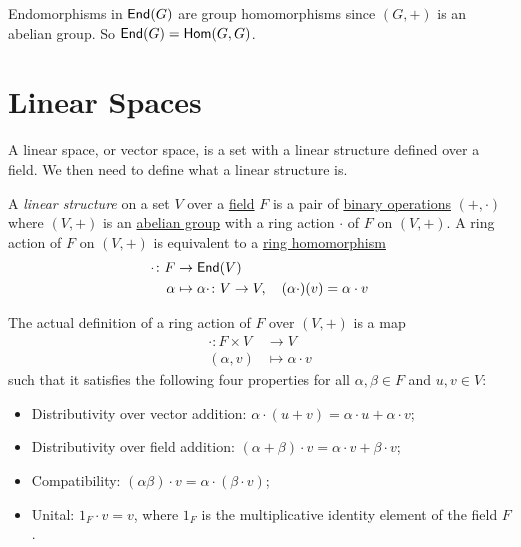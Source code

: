 \begin{remark}
  Endomorphisms in $\operatorname{\text{\normalfont\sffamily End}}(G)$ are group homomorphisms since $(G, +)$ is an abelian group. So $\operatorname{\text{\normalfont\sffamily End}}(G) = \operatorname{\text{\normalfont\sffamily Hom}}(G, G)$.
\end{remark}

\section{Linear Spaces}

A linear space, or vector space, is a set with a linear structure defined over a field. We then need to define what a linear structure is.

\begin{definition}\label{def:linear_structure}
  A \emph{linear structure} on a set $V$ over a \hyperref[def:field]{field} $F$ is a pair of \hyperref[def:binary_operation]{binary operations} $(+, \cdot)$ where $(V, +)$ is an \hyperref[def:abelian_structure]{abelian group} with a ring action $\cdot$ of $F$ on $(V, +)$. A ring action of $F$ on $(V, +)$ is equivalent to a \hyperref[def:ring_homomorphism]{ring homomorphism}
  \begin{align*}
    \cdot \colon F & \to \operatorname{\text{\normalfont\sffamily End}}(V)                                                              \\
    \alpha    & \mapsto \alpha \cdot \colon V \to V, \quad (\alpha \cdot)(v) = \alpha \cdot v
  \end{align*}
\end{definition}

\begin{remark}
  The actual definition of a ring action of $F$ over $(V, +)$ is a map
  \begin{align*}
    \cdot \colon F \times V & \to V                  \\
    (\alpha, v)        & \mapsto \alpha \cdot v
  \end{align*}
  such that it satisfies the following four properties for all $\alpha, \beta \in F$ and $u, v \in V$:
  \begin{itemize}
    \item Distributivity over vector addition: $\alpha \cdot (u + v) = \alpha \cdot u + \alpha \cdot v$;
    \item Distributivity over field addition: $(\alpha + \beta) \cdot v = \alpha \cdot v + \beta \cdot v$;
    \item Compatibility: $(\alpha \beta) \cdot v = \alpha \cdot (\beta \cdot v)$;
    \item Unital: $1_F \cdot v = v$, where $1_F$ is the multiplicative identity element of the field $F$.
  \end{itemize}
\end{remark}

